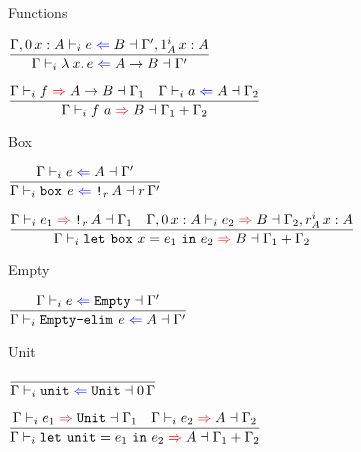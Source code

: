 \documentclass{beamer}
\begin{document}
\begin{frame}{Functions}

\begin{center}
  $\infrule{\checktype{\extend{\Gamma}[\Zero]{x}{A}}{e}{B}{\extend{\Gamma'}[\totalqty{\One}{A}]{x}{A}}}{\checktype{\Gamma}{\fun{x}{e}}{\Fun{A}{B}}{\Gamma'}}$

  \vspace{2em}

  $\infrule{\infertype{\Gamma}{f}{\Fun{A}{B}}{\Gamma_1} \quad \checktype{\Gamma}{a}{A}{\Gamma_2}}{\infertype{\Gamma}{\app{f}{a}}{B}{\addctx{\Gamma_1}{\Gamma_2}}}$
\end{center}

\end{frame}

\begin{frame}{Box}

\begin{center}
  $\infrule{\checktype{\Gamma}{e}{A}{\Gamma'}}{\checktype{\Gamma}{\boxintro{e}}{\Box[r]{A}}{\scalectx{r}{\Gamma'}}}$

  \vspace{2em}

  $\infrule{\infertype{\Gamma}{e_1}{\Box[r]{A}}{\Gamma_1} \quad \infertype{\extend{\Gamma}[\Zero]{x}{A}}{e_2}{B}{\extend{\Gamma_2}[\totalqty{r}{A}]{x}{A}}}{\infertype{\Gamma}{\boxelim{x}{e_1}{e_2}}{B}{\addctx{\Gamma_1}{\Gamma_2}}}$
\end{center}

\end{frame}

\begin{frame}{Empty}

\begin{center}
  $\infrule{\checktype{\Gamma}{e}{\Empty}{\Gamma'}}{\checktype{\Gamma}{\emptyelim{e}}{A}{\Gamma'}}$
\end{center}

\end{frame}

\begin{frame}{Unit}

\begin{center}
  $\infrule{}{\checktype{\Gamma}{\unit}{\Unit}{\scalectx{\Zero}{\Gamma}}}$

  \vspace{2em}

  $\infrule{\infertype{\Gamma}{e_1}{\Unit}{\Gamma_1} \quad \infertype{\Gamma}{e_2}{A}{\Gamma_2}}{\infertype{\Gamma}{\unitelim{e_1}{e_2}}{A}{\addctx{\Gamma_1}{\Gamma_2}}}$
\end{center}

\end{frame}
\end{document}
